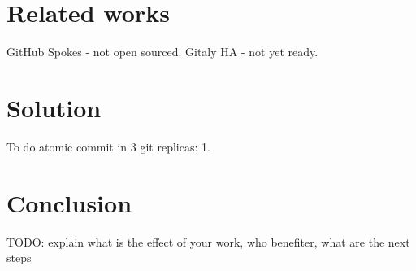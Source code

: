 \documentclass[acmlarge, screen, nonacm]{acmart}
\begin{document}
\section{Related works}

GitHub Spokes - not open sourced.
Gitaly HA - not yet ready.

\section{Solution}

To do atomic commit in 3 git replicas:
1.


\section{Conclusion}

TODO: explain what is the effect of your work, who benefiter, what are the next steps
\end{document}
